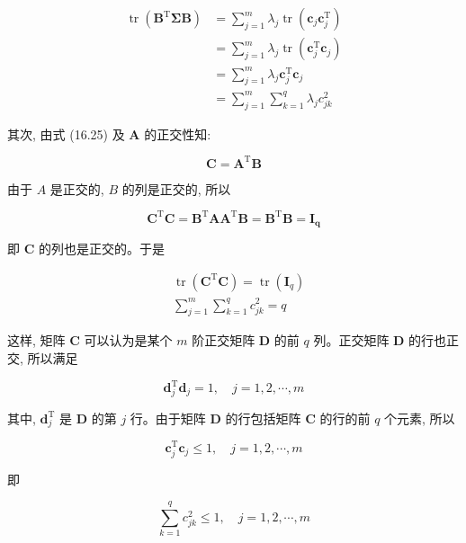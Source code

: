\documentclass[10pt]{article}
\begin{document}
\begin{align*}
\operatorname{tr}\left(\boldsymbol{B}^{\mathrm{T}} \boldsymbol{\Sigma} \boldsymbol{B}\right) & =\sum_{j=1}^{m} \lambda_{j} \operatorname{tr}\left(\boldsymbol{c}_{j} \boldsymbol{c}_{j}^{\mathrm{T}}\right) \\
& =\sum_{j=1}^{m} \lambda_{j} \operatorname{tr}\left(\boldsymbol{c}_{j}^{\mathrm{T}} \boldsymbol{c}_{j}\right) \\
& =\sum_{j=1}^{m} \lambda_{j} \boldsymbol{c}_{j}^{\mathrm{T}} \boldsymbol{c}_{j} \\
& =\sum_{j=1}^{m} \sum_{k=1}^{q} \lambda_{j} c_{j k}^{2} \tag{16.26}
\end{align*}


其次, 由式 (16.25) 及 $\boldsymbol{A}$ 的正交性知:

$$
\boldsymbol{C}=\boldsymbol{A}^{\mathrm{T}} \boldsymbol{B}
$$

由于 $A$ 是正交的, $B$ 的列是正交的, 所以

$$
\boldsymbol{C}^{\mathrm{T}} \boldsymbol{C}=\boldsymbol{B}^{\mathrm{T}} \boldsymbol{A} \boldsymbol{A}^{\mathrm{T}} \boldsymbol{B}=\boldsymbol{B}^{\mathrm{T}} \boldsymbol{B}=\boldsymbol{I}_{\boldsymbol{q}}
$$

即 $\boldsymbol{C}$ 的列也是正交的。于是


\begin{align*}
& \operatorname{tr}\left(\boldsymbol{C}^{\mathrm{T}} \boldsymbol{C}\right)=\operatorname{tr}\left(\boldsymbol{I}_{q}\right) \\
& \sum_{j=1}^{m} \sum_{k=1}^{q} c_{j k}^{2}=q \tag{16.27}
\end{align*}


这样, 矩阵 $\boldsymbol{C}$ 可以认为是某个 $m$ 阶正交矩阵 $\boldsymbol{D}$ 的前 $q$ 列。正交矩阵 $\boldsymbol{D}$ 的行也正交, 所以满足

$$
\boldsymbol{d}_{j}^{\mathrm{T}} \boldsymbol{d}_{j}=1, \quad j=1,2, \cdots, m
$$

其中, $\boldsymbol{d}_{j}^{\mathrm{T}}$ 是 $\boldsymbol{D}$ 的第 $j$ 行。由于矩阵 $\boldsymbol{D}$ 的行包括矩阵 $\boldsymbol{C}$ 的行的前 $q$ 个元素, 所以

$$
\boldsymbol{c}_{j}^{\mathrm{T}} \boldsymbol{c}_{j} \leqslant 1, \quad j=1,2, \cdots, m
$$

即


\begin{equation*}
\sum_{k=1}^{q} c_{j k}^{2} \leqslant 1, \quad j=1,2, \cdots, m \tag{16.28}
\end{equation*}
\end{document}
